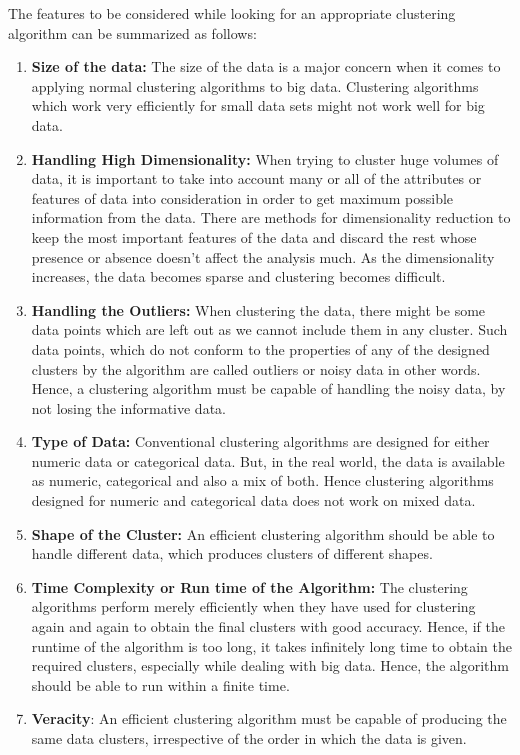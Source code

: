 \documentclass[sigconf]{acmart}
\begin{document}
The features to be considered while looking for an appropriate clustering algorithm can be summarized as follows\cite{Fahad2014}:
\begin{enumerate}
    \item \textbf{Size of the data:} The size of the data is a major concern when it comes to applying normal clustering algorithms to big data. Clustering algorithms which work very efficiently for small data sets might not work well for big data.
    \item \textbf{Handling High Dimensionality:} When trying to cluster huge volumes of data, it is important to take into account many or all of the attributes or features of data into consideration in order to get maximum possible information from the data. There are methods for dimensionality reduction to keep the most important features of the data and discard the rest whose presence or absence doesn't affect the analysis much. As the dimensionality increases, the data becomes sparse and clustering becomes difficult.
    \item \textbf{Handling the Outliers:} When clustering the data, there might be some data points which are left out as we cannot include them in any cluster. Such data points, which do not conform to the properties of any of the designed clusters by the algorithm are called outliers or noisy data in other words. Hence, a clustering algorithm must be capable of handling the noisy data, by not losing the informative data.
    \item \textbf{Type of Data:} Conventional clustering algorithms are designed for either numeric data or categorical data. But, in the real world, the data is available as numeric, categorical and also a mix of both. Hence clustering algorithms designed for numeric and categorical data does not work on mixed data.
    \item \textbf{Shape of the Cluster:} An efficient clustering algorithm should be able to handle different data, which produces clusters of different shapes.
    \item \textbf{Time Complexity or Run time of the Algorithm:} The clustering algorithms perform merely efficiently when they have used for clustering again and again to obtain the final clusters with good accuracy. Hence, if the runtime of the algorithm is too long, it takes infinitely long time to obtain the required clusters, especially while dealing with big data. Hence, the algorithm should be able to run within a finite time.
    \item \textbf{Veracity}: An efficient clustering algorithm must be capable of producing the same data clusters, irrespective of the order in which the data is given.
\end{enumerate}
\end{document}
